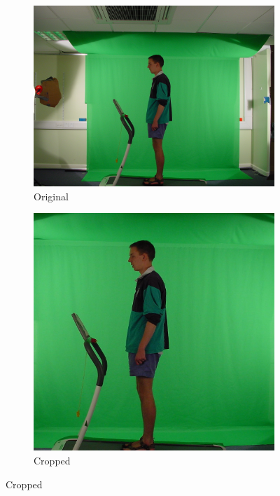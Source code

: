 \documentclass[10pt,journal,compsoc]{IEEEtran}
\begin{document}
\begin{figure}[!htb]
\begin{subfigure}[h]{0.3\linewidth}
    \includegraphics[width=\linewidth]{original}
\caption{Original}
\end{subfigure}
\hfill
\begin{subfigure}[h]{0.3\linewidth}
\includegraphics[width=\linewidth]{cropped}
\caption{Cropped}
\end{subfigure}
\hfill

\end{figure}
\end{document}
